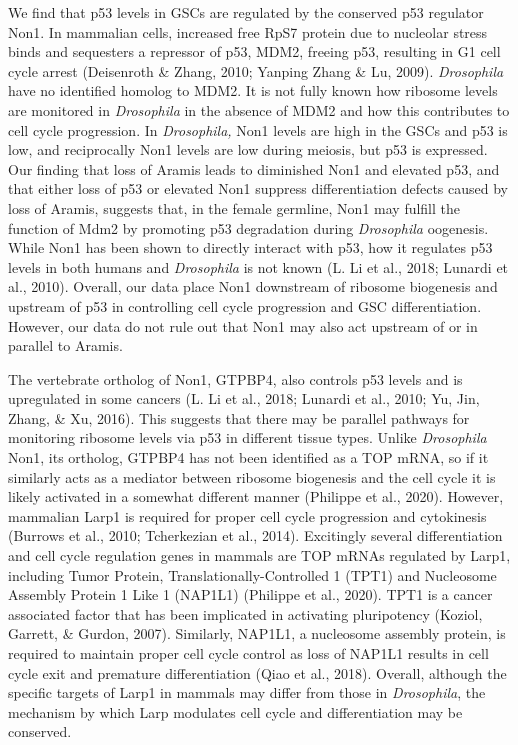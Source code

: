 \documentclass[12pt,oneside]{reedthesis}
\begin{document}
We find that p53 levels in GSCs are regulated by the conserved p53
regulator Non1. In mammalian cells, increased free RpS7 protein due to
nucleolar stress binds and sequesters a repressor of p53, MDM2, freeing
p53, resulting in G1 cell cycle arrest (Deisenroth \& Zhang, 2010; Yanping Zhang \& Lu, 2009). \emph{Drosophila} have no identified
homolog to MDM2. It is not fully known how ribosome levels are monitored
in \emph{Drosophila} in the absence of MDM2 and how this contributes to cell
cycle progression. In \emph{Drosophila,} Non1 levels are high in the GSCs and
p53 is low, and reciprocally Non1 levels are low during meiosis, but p53
is expressed. Our finding that loss of Aramis leads to diminished Non1
and elevated p53, and that either loss of p53 or elevated Non1 suppress
differentiation defects caused by loss of Aramis, suggests that, in the
female germline, Non1 may fulfill the function of Mdm2 by promoting p53
degradation during \emph{Drosophila} oogenesis. While Non1 has been shown to
directly interact with p53, how it regulates p53 levels in both humans
and \emph{Drosophila} is not known (L. Li et al., 2018; Lunardi et al., 2010). Overall,
our data place Non1 downstream of ribosome biogenesis and upstream of
p53 in controlling cell cycle progression and GSC differentiation.
However, our data do not rule out that Non1 may also act upstream of or
in parallel to Aramis.

The vertebrate ortholog of Non1, GTPBP4, also controls p53 levels and is
upregulated in some cancers (L. Li et al., 2018; Lunardi et al., 2010; Yu, Jin, Zhang, \& Xu, 2016). This suggests that there may be
parallel pathways for monitoring ribosome levels via p53 in different
tissue types. Unlike \emph{Drosophila} Non1, its ortholog, GTPBP4 has not
been identified as a TOP mRNA, so if it similarly acts as a mediator
between ribosome biogenesis and the cell cycle it is likely activated in
a somewhat different manner (Philippe et al., 2020).
However, mammalian Larp1 is required for proper cell cycle progression
and cytokinesis (Burrows et al., 2010; Tcherkezian et al., 2014).
Excitingly several differentiation and cell cycle regulation genes in
mammals are TOP mRNAs regulated by Larp1, including Tumor Protein,
Translationally-Controlled 1 (TPT1) and Nucleosome Assembly Protein 1
Like 1 (NAP1L1) (Philippe et al., 2020). TPT1 is a cancer
associated factor that has been implicated in activating pluripotency
(Koziol, Garrett, \& Gurdon, 2007). Similarly, NAP1L1, a
nucleosome assembly protein, is required to maintain proper cell cycle
control as loss of NAP1L1 results in cell cycle exit and premature
differentiation (Qiao et al., 2018). Overall, although
the specific targets of Larp1 in mammals may differ from those in
\emph{Drosophila}, the mechanism by which Larp modulates cell cycle and
differentiation may be conserved.
\end{document}
